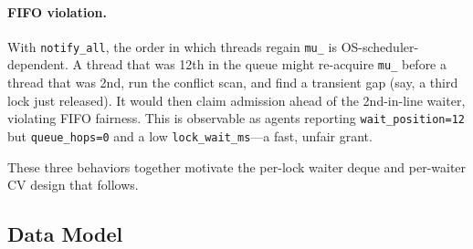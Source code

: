 \documentclass[sigconf]{acmart}
\begin{document}
\paragraph{\textbf{FIFO violation.}}
With \texttt{notify\_all}, the order in which threads regain
\texttt{mu\_} is OS-scheduler-dependent. A thread that was 12th in the
queue might re-acquire \texttt{mu\_} before a thread that was 2nd, run
the conflict scan, and find a transient gap (say, a third lock just
released). It would then claim admission ahead of the 2nd-in-line waiter,
violating FIFO fairness. This is observable as agents reporting
\texttt{wait\_position=12} but \texttt{queue\_hops=0} and a low
\texttt{lock\_wait\_ms}---a fast, unfair grant.

These three behaviors together motivate the per-lock waiter deque and
per-waiter CV design that follows.

\subsection{Data Model}
\label{sec:lock-data}





\end{document}
